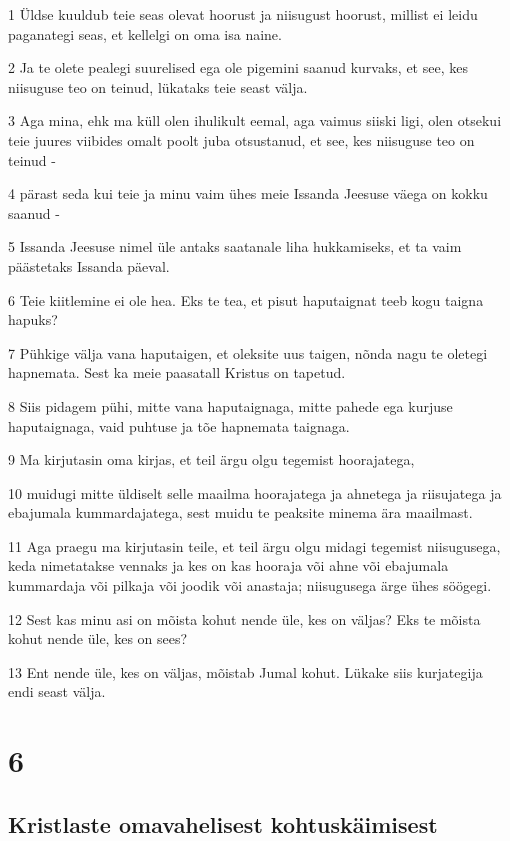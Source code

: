 \par 1 Üldse kuuldub teie seas olevat hoorust ja niisugust hoorust, millist ei leidu paganategi seas, et kellelgi on oma isa naine.
\par 2 Ja te olete pealegi suurelised ega ole pigemini saanud kurvaks, et see, kes niisuguse teo on teinud, lükataks teie seast välja.
\par 3 Aga mina, ehk ma küll olen ihulikult eemal, aga vaimus siiski ligi, olen otsekui teie juures viibides omalt poolt juba otsustanud, et see, kes niisuguse teo on teinud -
\par 4 pärast seda kui teie ja minu vaim ühes meie Issanda Jeesuse väega on kokku saanud -
\par 5 Issanda Jeesuse nimel üle antaks saatanale liha hukkamiseks, et ta vaim päästetaks Issanda päeval.
\par 6 Teie kiitlemine ei ole hea. Eks te tea, et pisut haputaignat teeb kogu taigna hapuks?
\par 7 Pühkige välja vana haputaigen, et oleksite uus taigen, nõnda nagu te oletegi hapnemata. Sest ka meie paasatall Kristus on tapetud.
\par 8 Siis pidagem pühi, mitte vana haputaignaga, mitte pahede ega kurjuse haputaignaga, vaid puhtuse ja tõe hapnemata taignaga.
\par 9 Ma kirjutasin oma kirjas, et teil ärgu olgu tegemist hoorajatega,
\par 10 muidugi mitte üldiselt selle maailma hoorajatega ja ahnetega ja riisujatega ja ebajumala kummardajatega, sest muidu te peaksite minema ära maailmast.
\par 11 Aga praegu ma kirjutasin teile, et teil ärgu olgu midagi tegemist niisugusega, keda nimetatakse vennaks ja kes on kas hooraja või ahne või ebajumala kummardaja või pilkaja või joodik või anastaja; niisugusega ärge ühes söögegi.
\par 12 Sest kas minu asi on mõista kohut nende üle, kes on väljas? Eks te mõista kohut nende üle, kes on sees?
\par 13 Ent nende üle, kes on väljas, mõistab Jumal kohut. Lükake siis kurjategija endi seast välja.


\chapter{6}

\section*{Kristlaste omavahelisest kohtuskäimisest}

